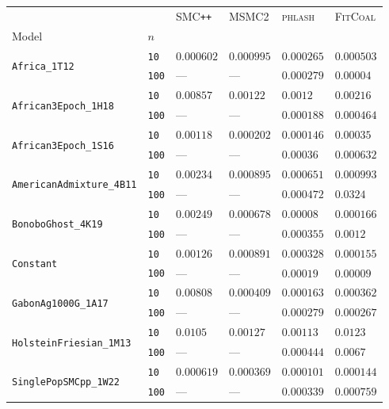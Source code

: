 \documentclass{article}
\begin{document}
\begin{footnotesize}
\begin{tabular}{llllll}
\toprule
 &  & \textsc{SMC}\texttt{{++}} & \textsc{MSMC2} & \textsc{phlash} & \textsc{FitCoal} \\
Model & $n$ &  &  &  &  \\
\midrule
\multirow[c]{2}{*}{\texttt{Africa\_1T12}} & \texttt{10} & $0.000602$ & $0.000995$ & $0.000265$ & $0.000503$ \\
 & \texttt{100} & --- & --- & $0.000279$ & $0.00004$ \\
\cline{1-6}
\multirow[c]{2}{*}{\texttt{African3Epoch\_1H18}} & \texttt{10} & $0.00857$ & $0.00122$ & $0.0012$ & $0.00216$ \\
 & \texttt{100} & --- & --- & $0.000188$ & $0.000464$ \\
\cline{1-6}
\multirow[c]{2}{*}{\texttt{African3Epoch\_1S16}} & \texttt{10} & $0.00118$ & $0.000202$ & $0.000146$ & $0.00035$ \\
 & \texttt{100} & --- & --- & $0.00036$ & $0.000632$ \\
\cline{1-6}
\multirow[c]{2}{*}{\texttt{AmericanAdmixture\_4B11}} & \texttt{10} & $0.00234$ & $0.000895$ & $0.000651$ & $0.000993$ \\
 & \texttt{100} & --- & --- & $0.000472$ & $0.0324$ \\
\cline{1-6}
\multirow[c]{2}{*}{\texttt{BonoboGhost\_4K19}} & \texttt{10} & $0.00249$ & $0.000678$ & $0.00008$ & $0.000166$ \\
 & \texttt{100} & --- & --- & $0.000355$ & $0.0012$ \\
\cline{1-6}
\multirow[c]{2}{*}{\texttt{Constant}} & \texttt{10} & $0.00126$ & $0.000891$ & $0.000328$ & $0.000155$ \\
 & \texttt{100} & --- & --- & $0.00019$ & $0.00009$ \\
\cline{1-6}
\multirow[c]{2}{*}{\texttt{GabonAg1000G\_1A17}} & \texttt{10} & $0.00808$ & $0.000409$ & $0.000163$ & $0.000362$ \\
 & \texttt{100} & --- & --- & $0.000279$ & $0.000267$ \\
\cline{1-6}
\multirow[c]{2}{*}{\texttt{HolsteinFriesian\_1M13}} & \texttt{10} & $0.0105$ & $0.00127$ & $0.00113$ & $0.0123$ \\
 & \texttt{100} & --- & --- & $0.000444$ & $0.0067$ \\
\cline{1-6}
\multirow[c]{2}{*}{\texttt{SinglePopSMCpp\_1W22}} & \texttt{10} & $0.000619$ & $0.000369$ & $0.000101$ & $0.000144$ \\
 & \texttt{100} & --- & --- & $0.000339$ & $0.000759$ \\

\end{tabular}
\end{footnotesize}
\end{document}
